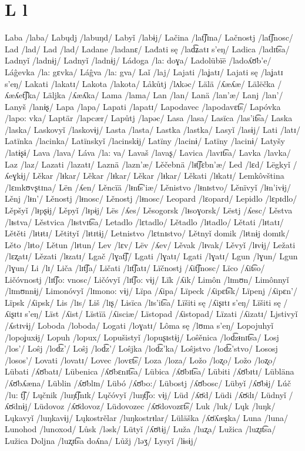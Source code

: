 \chapter{L l}

Laba /laba/
Labųdj /labuŋd/
Labyǐ /labɨj/
Lačina /lat͡ʃɪna/
Lačnostj /lat͡ʃnosc/
Lad /lad/
Lad /lad/
Ladane /ladanɛ/
Lađati sę /lad͡ʑatɪ s’eŋ/
Ladica /ladɪt͡sa/
Ladnyǐ /ladnɨj/
Ladnyǐ /ladnɨj/
Ládoga /la: doɣa/
Ladolübïë /ladoʎʊ̈b’e/
Láĝevka /la: gɛvka/
Láĝva /la: gva/
Laǐ /laj/
Lajati /laʝatɪ/
Lajati sę /laʝatɪ s’eŋ/
Lakati /lakatɪ/
Lakota /lakota/
Låkůtj /lʌkəc/
Lälä /ʎæʎæ/
Lälëčka /ʎæʎet͡ʃka/
Läljka /ʎæʎka/
Lama /lama/
Lan /lan/
Lanä /lan’æ/
Lanj /lan’/
Lanyš /lanɨʂ/
Lapa /lapa/
Lapati /lapatɪ/
Lapodavec /lapodavɛt͡s/
Lapóvka /lapo: vka/
Laptär /lapcær/
Lapůtj /lapəc/
Lasa /lasa/
Lasïca /las’it͡sa/
Laska /laska/
Laskovyǐ /laskovɨj/
Lasta /lasta/
Lastka /lastka/
Lasyǐ /lasɨj/
Lati /latɪ/
Latïnka /lacinka/
Latïnskyǐ /lacinskɨj/
Latïny /lacinɨ/
Latïny /lacinɨ/
Latyšy /latɨʂɨ/
Lava /lava/
Láva /la: va/
Lavaš /lavaʂ/
Lavica /lavɪt͡sa/
Lavka /lavka/
Laz /laz/
Lazati /lazatɪ/
Laznä /lazn’æ/
Lěčebnä /lᵻt͡ʃɛbn’æ/
Led /lɛd/
Lëgkyǐ /ʎeɣkɨj/
Lěkar /lᵻkar/
Lěkar /lᵻkar/
Lěkar /lᵻkar/
Lěkati /lᵻkatɪ/
Lemkôvština /lɛmkʊvʂtɪna/
Lën /ʎen/
Lěncïä /lᵻnt͡s’iæ/
Lěnistvo /lᵻnɪstvo/
Lěnïvyǐ /lᵻn’ivɨj/
Lěnj /lᵻn’/
Lěnostj /lᵻnosc/
Lěnostj /lᵻnosc/
Leopard /lɛopard/
Lepidlo /lɛpɪdlo/
Lěpšyǐ /lᵻpʂɨj/
Lěpyǐ /lᵻpɨj/
Lës /ʎes/
Lěsogorsk /lᵻsoɣorsk/
Lëstj /ʎesc/
Lěstva /lᵻstva/
Lěstvica /lᵻstvɪt͡sa/
Letadlo /lɛtadlo/
Lětadlo /lᵻtadlo/
Lětati /lᵻtatɪ/
Lětěti /lᵻtᵻtɪ/
Lětityǐ /lᵻtɪtɨj/
Letnistvo /lɛtnɪstvo/
Lětnyǐ domik /lᵻtnɨj domɪk/
Lěto /lᵻto/
Lětun /lᵻtun/
Lev /lɛv/
Lëv /ʎev/
Lěvak /lᵻvak/
Lěvyǐ /lᵻvɨj/
Ležati /lɛʐatɪ/
Lězati /lᵻzatɪ/
Lgač /lɣat͡ʃ/
Lgati /lɣatɪ/
Lgati /lɣatɪ/
Lgun /lɣun/
Lgun /lɣun/
Li /lɪ/
Liča /lɪt͡ʃa/
Ličati /lɪt͡ʃatɪ/
Lïčnostj /ʎit͡ʃnosc/
Lïco /ʎit͡so/
Ličóvnostj /lɪt͡ʃo: vnosc/
Ličóvyǐ /lɪt͡ʃo: vɨj/
Lïk /ʎik/
Limôn /lɪmʊn/
Limônnyǐ /lɪmʊnnɨj/
Limonóvyǐ /lɪmono: vɨj/
Lïpa /ʎipa/
Lïpeck /ʎipɛt͡sk/
Lïpenj /ʎipɛn’/
Lïpsk /ʎipsk/
Lis /lɪs/
Liš /lɪʂ/
Lisïca /lɪs’it͡sa/
Lïšiti sę /ʎiʂɪtɪ s’eŋ/
Lïšiti sę /ʎiʂɪtɪ s’eŋ/
Lïst /ʎist/
Lïstïä /ʎisciæ/
Lïstopad /ʎistopad/
Lïzati /ʎizatɪ/
Ljstivyǐ /ʎstɪvɨj/
Loboda /loboda/
Logati /loɣatɪ/
Lôma sę /lʊma s’eŋ/
Lopojuhyǐ /lopoʝuxɨj/
Lopuh /lopux/
Lopušistyǐ /lopuʂɪstɨj/
Loŝěnica /lod͡zᵻnɪt͡sa/
Losj /los’/
Loŝj /lod͡z’/
Loŝj /lod͡z’/
Loŝjka /lod͡z’ka/
Loŝjstvo /lod͡z’stvo/
Lososj /losos’/
Lovati /lovatɪ/
Lovec /lovɛt͡s/
Loza /loza/
Ložo /loʐo/
Ložo /loʐo/
Lübati /ʎʊ̈batɪ/
Lübenica /ʎʊ̈bɛnɪt͡sa/
Lübica /ʎʊ̈bɪt͡sa/
Lübiti /ʎʊ̈bɪtɪ/
Lübläna /ʎʊ̈bʎæna/
Lüblin /ʎʊ̈blɪn/
Lübó /ʎʊ̈bo:/
Lübostj /ʎʊ̈bosc/
Lübyǐ /ʎʊ̈bɨj/
Lúč /lu: t͡ʃ/
Lųčnik /luŋt͡ʃnɪk/
Lųčóvyǐ /luŋt͡ʃo: vɨj/
Lüd /ʎʊ̈d/
Lüdi /ʎʊ̈dɪ/
Lüdnyǐ /ʎʊ̈dnɨj/
Lüdovoz /ʎʊ̈dovoz/
Lüdovozec /ʎʊ̈dovozɛt͡s/
Luk /luk/
Lųk /luŋk/
Lųkavyǐ /luŋkavɨj/
Lųkostrělar /luŋkostrᵻlar/
Lüläška /ʎʊ̈ʎæʂka/
Luna /luna/
Lunohod /lunoxod/
Lůsk /ləsk/
Lütyǐ /ʎʊ̈tɨj/
Luža /luʐa/
Lužica /luʐɪt͡sa/
Lužica Doljna /luʐɪt͡sa doʎna/
Lůžj /ləʒ/
Lysyǐ /lɨsɨj/